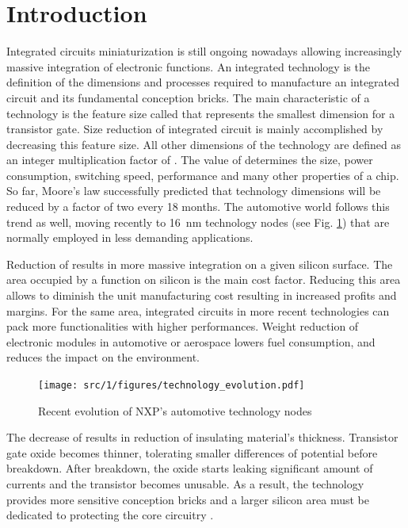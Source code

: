 \chapter*{Introduction}
 
\label{sec:global-intro}

Integrated circuits miniaturization is still ongoing nowadays allowing increasingly massive integration of electronic functions.
An integrated technology is the definition of the dimensions and processes required to manufacture an integrated circuit and its fundamental conception bricks.
The main characteristic of a technology is the feature size called \textlambda{} that represents the smallest dimension for a transistor gate.
Size reduction of integrated circuit is mainly accomplished by decreasing this feature size.
All other dimensions of the technology are defined as an integer multiplication factor of \textlambda{}.
The value of \textlambda{} determines the size, power consumption, switching speed, performance and many other properties of a chip.
So far, Moore's law successfully predicted that technology dimensions will be reduced by a factor of two every 18 months.
The automotive world follows this trend as well, moving recently to \SI{16}{\nano\metre} technology nodes (see Fig. \ref{fig:nxp-techno-increase}) \cite{evolution_technologies} that are normally employed in less demanding applications.

Reduction of \textlambda{} results in more massive integration on a given silicon surface.
The area occupied by a function on silicon is the main cost factor.
Reducing this area allows to diminish the unit manufacturing cost resulting in increased profits and margins.
For the same area, integrated circuits in more recent technologies can pack more functionalities with higher performances.
Weight reduction of electronic modules in automotive or aerospace lowers fuel consumption, and reduces the impact on the environment.

\begin{figure}[!h]
  \centering
  \texttt{[image: src/1/figures/technology\_evolution.pdf]}
  \caption{Recent evolution of NXP's automotive technology nodes \cite{evolution_technologies}}
  \label{fig:nxp-techno-increase}
\end{figure}

The decrease of \textlambda{} results in reduction of insulating material's thickness.
Transistor gate oxide becomes thinner, tolerating smaller differences of potential before breakdown.
After breakdown, the oxide starts leaking significant amount of currents and the transistor becomes unusable.
As a result, the technology provides more sensitive conception bricks and a larger silicon area must be dedicated to protecting the core circuitry \cite{evolution_technologies}.

